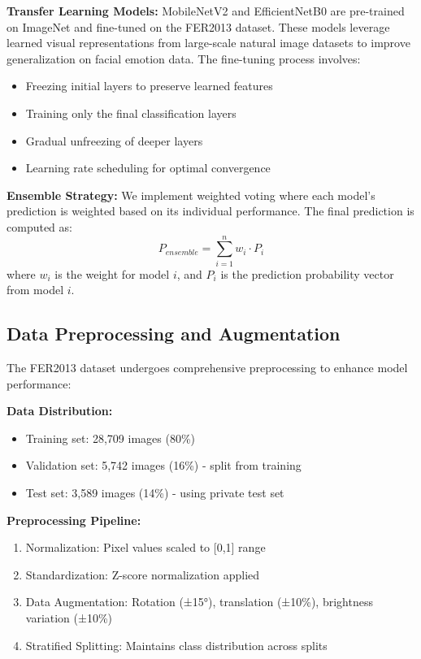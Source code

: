 \documentclass[conference]{IEEEtran}
\begin{document}
\textbf{Transfer Learning Models:} MobileNetV2 and EfficientNetB0 are pre-trained on ImageNet and fine-tuned on the FER2013 dataset. These models leverage learned visual representations from large-scale natural image datasets to improve generalization on facial emotion data. The fine-tuning process involves:
\begin{itemize}
    \item Freezing initial layers to preserve learned features
    \item Training only the final classification layers
    \item Gradual unfreezing of deeper layers
    \item Learning rate scheduling for optimal convergence
\end{itemize}

\textbf{Ensemble Strategy:} We implement weighted voting where each model's prediction is weighted based on its individual performance. The final prediction is computed as:
\begin{equation}
P_{ensemble} = \sum_{i=1}^{n} w_i \cdot P_i
\end{equation}
where $w_i$ is the weight for model $i$, and $P_i$ is the prediction probability vector from model $i$.

\subsection{Data Preprocessing and Augmentation}
The FER2013 dataset undergoes comprehensive preprocessing to enhance model performance:

\textbf{Data Distribution:}
\begin{itemize}
    \item Training set: 28,709 images (80\%)
    \item Validation set: 5,742 images (16\%) - split from training
    \item Test set: 3,589 images (14\%) - using private test set
\end{itemize}

\textbf{Preprocessing Pipeline:}
\begin{enumerate}
    \item Normalization: Pixel values scaled to [0,1] range
    \item Standardization: Z-score normalization applied
    \item Data Augmentation: Rotation (±15°), translation (±10\%), brightness variation (±10\%)
    \item Stratified Splitting: Maintains class distribution across splits
\end{enumerate}
\end{document}
